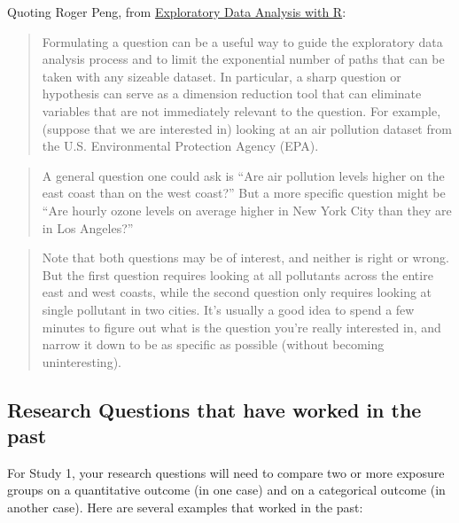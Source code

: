 \documentclass[]{book}
\theoremstyle{definition}
\theoremstyle{definition}
\theoremstyle{definition}
\theoremstyle{remark}
\begin{document}
Quoting Roger Peng, from
\href{https://bookdown.org/rdpeng/exdata/}{Exploratory Data Analysis
with R}:

\begin{quote}
Formulating a question can be a useful way to guide the exploratory data
analysis process and to limit the exponential number of paths that can
be taken with any sizeable dataset. In particular, a sharp question or
hypothesis can serve as a dimension reduction tool that can eliminate
variables that are not immediately relevant to the question. For
example, (suppose that we are interested in) looking at an air pollution
dataset from the U.S. Environmental Protection Agency (EPA).
\end{quote}

\begin{quote}
A general question one could ask is ``Are air pollution levels higher on
the east coast than on the west coast?'' But a more specific question
might be ``Are hourly ozone levels on average higher in New York City
than they are in Los Angeles?''
\end{quote}

\begin{quote}
Note that both questions may be of interest, and neither is right or
wrong. But the first question requires looking at all pollutants across
the entire east and west coasts, while the second question only requires
looking at single pollutant in two cities. It's usually a good idea to
spend a few minutes to figure out what is the question you're really
interested in, and narrow it down to be as specific as possible (without
becoming uninteresting).
\end{quote}

\hypertarget{research-questions-that-have-worked-in-the-past}{%
\subsection{Research Questions that have worked in the
past}\label{research-questions-that-have-worked-in-the-past}}

For Study 1, your research questions will need to compare two or more
exposure groups on a quantitative outcome (in one case) and on a
categorical outcome (in another case). Here are several examples that
worked in the past:
\end{document}
